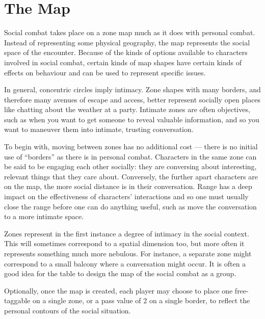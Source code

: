 \section{The Map}\label{sec:social-combat-map}

Social combat takes place on a zone map much as it does with personal combat. Instead of representing some physical geography, the map represents the social space of the encounter. Because of the kinds of options available to characters involved in social combat, certain kinds of map shapes have certain kinds of effects on behaviour and can be used to represent specific issues.

In general, concentric circles imply intimacy. Zone shapes with many borders, and therefore many avenues of escape and access, better represent socially open places like chatting about the weather at a party. Intimate zones are often objectives, such as when you want to get someone to reveal valuable information, and so you want to maneuver them into intimate, trusting conversation.


To begin with, moving between zones has no additional cost --- there is no initial use of ``borders'' as there is in personal combat. Characters in the same zone can be said to be engaging each other socially: they are conversing about interesting, relevant things that they care about. Conversely, the further apart characters are on the map, the more social distance is in their conversation. Range has a deep impact on the effectiveness of characters' interactions and so one must usually close the range before one can do anything useful, such as move the conversation to a more intimate space.


Zones represent in the first instance a degree of intimacy in the social context. This will sometimes correspond to a spatial dimension too, but more often it represents something much more nebulous. For instance, a separate zone might correspond to a small balcony where a conversation might occur. It is often a good idea for the table to design the map of the social combat as a group.

Optionally, once the map is created, each player may choose to place one free-taggable \Aspect{} on a single zone, or a pass value of 2 on a single border, to reflect the personal contours of the social situation.


